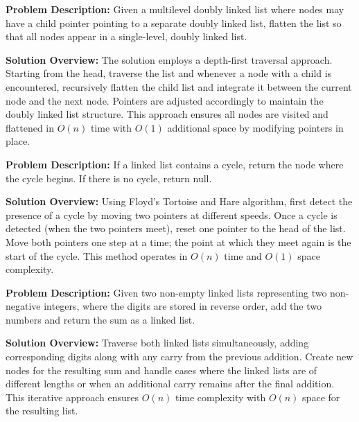 
\textbf{Problem Description:}  
Given a multilevel doubly linked list where nodes may have a child pointer pointing to a separate doubly linked list, flatten the list so that all nodes appear in a single-level, doubly linked list.

\textbf{Solution Overview:}  
The solution employs a depth-first traversal approach. Starting from the head, traverse the list and whenever a node with a child is encountered, recursively flatten the child list and integrate it between the current node and the next node. Pointers are adjusted accordingly to maintain the doubly linked list structure. This approach ensures all nodes are visited and flattened in \(O(n)\) time with \(O(1)\) additional space by modifying pointers in place.


\textbf{Problem Description:}  
If a linked list contains a cycle, return the node where the cycle begins. If there is no cycle, return null.

\textbf{Solution Overview:}  
Using Floyd’s Tortoise and Hare algorithm, first detect the presence of a cycle by moving two pointers at different speeds. Once a cycle is detected (when the two pointers meet), reset one pointer to the head of the list. Move both pointers one step at a time; the point at which they meet again is the start of the cycle. This method operates in \(O(n)\) time and \(O(1)\) space complexity.


\textbf{Problem Description:}  
Given two non-empty linked lists representing two non-negative integers, where the digits are stored in reverse order, add the two numbers and return the sum as a linked list.

\textbf{Solution Overview:}  
Traverse both linked lists simultaneously, adding corresponding digits along with any carry from the previous addition. Create new nodes for the resulting sum and handle cases where the linked lists are of different lengths or when an additional carry remains after the final addition. This iterative approach ensures \(O(n)\) time complexity with \(O(n)\) space for the resulting list.

